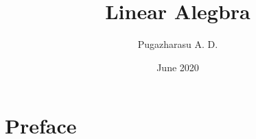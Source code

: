 \documentclass[a4paper,12pt]{book}
\begin{document}
\author{Pugazharasu A. D.}
\title{Linear Alegbra}
\date{June 2020}

\frontmatter
\maketitle
\chapter{Preface}
\tableofcontents

\mainmatter





%
%





\backmatter
\end{document}
